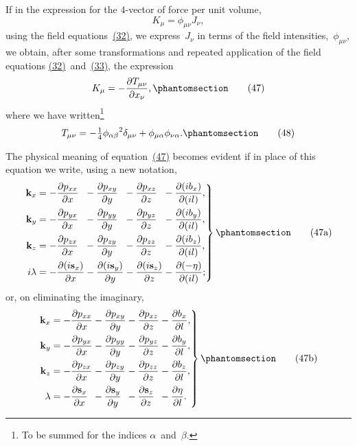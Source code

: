 \documentclass[12pt]{book}[2005/09/16]
\newcommand{\Change}[2]{#2}
\newcommand{\Add}[1]{\Change{}{#1}}
\newcommand{\PageSep}[1]{\ignorespaces}
\newcommand{\Tag}[1]{%
  \phantomsection
  \label{eqn:#1}
  \tag*{#1}
}
\newcommand{\Eqref}[1]{\hyperref[eqn:#1]{#1}}
\newcommand{\dd}{\partial}
\newcommand{\Vector}[1]{\mathbf{#1}}
\newcommand{\veci}{\Vector{i}}
\renewcommand{\k}{\Vector{k}}
\newcommand{\s}{\Vector{s}}
\begin{document}
If in the expression for the $4$-vector of force per unit
volume,
\[
K_{\mu} = \phi_{\mu\nu} J_{\nu}\Add{,}
\]
using the field equations~\Eqref{(32)}, we express~$J_{\nu}$ in terms of
the field intensities,~$\phi_{\mu\nu}$, we obtain, after some transformations
and repeated application of the field equations
\Eqref{(32)}~and~\Eqref{(33)}, the expression
\[
K_{\mu} = -\frac{\dd T_{\mu\nu}}{\dd x_{\nu}}\Add{,}
\Tag{(47)}
\]
\PageSep{53}
where we have written\footnote
  {To be summed for the indices $\alpha$~and~$\beta$.}
\[
T_{\mu\nu}
  = -\tfrac{1}{4}{\phi_{\alpha\beta}}^{2} \delta_{\mu\nu}
    + \phi_{\mu\alpha} \phi_{\nu\alpha}\Add{.}
\Tag{(48)}
\]

The physical meaning of equation~\Eqref{(47)} becomes evident
if in place of this equation we write, using a new
notation,
\[
\left.
\begin{alignedat}{4}
\k_{x} &= -\frac{\dd p_{xx}}{\dd x}
  &&- \frac{\dd p_{xy}}{\dd y}
  &&- \frac{\dd p_{xz}}{\dd z}
  &&- \frac{\dd (\Change{\veci}{i} b_{x})}{\dd (\Change{\veci}{i} l)}\Add{,} \\
%
\k_{y} &= -\frac{\dd p_{yx}}{\dd x}
  &&- \frac{\dd p_{yy}}{\dd y}
  &&- \frac{\dd p_{yz}}{\dd z}
  &&- \frac{\dd (\Change{\veci}{i} b_{y})}{\dd (\Change{\veci}{i} l)}\Add{,} \\
%
\k_{z} &= -\frac{\dd p_{zx}}{\dd x}
  &&- \frac{\dd p_{zy}}{\dd y}
  &&- \frac{\dd p_{zz}}{\dd z}
  &&- \frac{\dd (\Change{\veci}{i} b_{z})}{\dd (\Change{\veci}{i} l)}\Add{,} \\
%
\Change{\veci}{i}\lambda
  &= -\frac{\dd (\Change{\veci}{i} \s_{x})}{\dd x}
  &&- \frac{\dd (\Change{\veci}{i} \s_{y})}{\dd y}
  &&- \frac{\dd (\Change{\veci}{i} \s_{z})}{\dd z}
  &&- \frac{\dd (-\eta)}{\dd (\Change{\veci}{i} l)}\Add{;}
\end{alignedat}
\right\}
\Tag{(47a)}
\]
or, on eliminating the imaginary,
\[
\left.
\begin{alignedat}{4}
\k_{x} &= -\frac{\dd p_{xx}}{\Change{\dd_{x}}{\dd x}}
  &&- \frac{\dd p_{xy}}{\dd y}
  &&- \frac{\dd p_{xz}}{\dd z}
  &&- \frac{\dd b_{x}}{\dd l}\Add{,} \\
%
\k_{y} &= -\frac{\dd p_{yx}}{\dd x}
  &&- \frac{\dd p_{yy}}{\dd y}
  &&- \frac{\dd p_{yz}}{\dd z}
  &&- \frac{\dd b_{y}}{\dd l}\Add{,} \\
%
\k_{z} &= -\frac{\dd p_{zx}}{\dd x}
  &&- \frac{\dd p_{zy}}{\dd y}
  &&- \frac{\dd p_{zz}}{\dd z}
  &&- \frac{\dd b_{z}}{\dd l}\Add{,} \\
%
\lambda
  &= -\frac{\dd \s_{x}}{\dd x}
  &&- \frac{\dd \s_{y}}{\dd y}
  &&- \frac{\dd \s_{z}}{\dd z}
  &&- \frac{\dd \eta}{\dd l}\Add{.}
\end{alignedat}
\right\}
\Tag{(47b)}
\]
\end{document}
